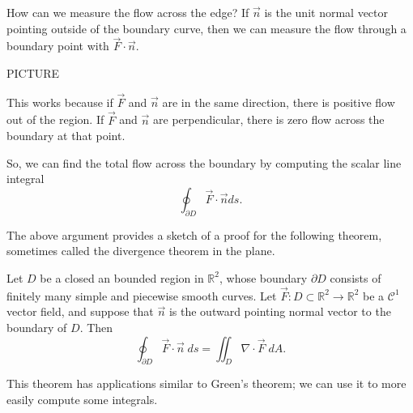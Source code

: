\documentclass{ximera}
\begin{document}
How can we measure the flow across the edge? If $\vec{n}$ is the unit normal vector pointing outside of the boundary curve, then we can measure the flow through a boundary point with $\vec{F}\cdot \vec{n}$.

PICTURE

This works because if $\vec{F}$ and $\vec{n}$ are in the same direction, there is positive flow out of the region. If $\vec{F}$ and $\vec{n}$ are perpendicular, there is zero flow across the boundary at that point.

So, we can find the total flow across the boundary by computing the scalar line integral
\[
\oint_{\partial D}\vec{F}\cdot \vec{n} ds.
\]


The above argument provides a sketch of a proof for the following theorem, sometimes called the divergence theorem in the plane.

\begin{theorem}
Let $D$ be a closed an bounded region in $\mathbb{R}^2$, whose boundary $\partial D$ consists of finitely many simple and piecewise smooth curves. Let $\vec{F}:D\subset\mathbb{R}^2\rightarrow\mathbb{R}^2$ be a $\mathcal{C}^1$ vector field, and suppose that $\vec{n}$ is the outward pointing normal vector to the boundary of $D$. Then
\[
\oint_{\partial D}\vec{F}\cdot \vec{n}\;ds = \iint_D \nabla\cdot \vec{F}\;dA.
\]
\end{theorem}

This theorem has applications similar to Green's theorem; we can use it to more easily compute some integrals.
\end{document}
